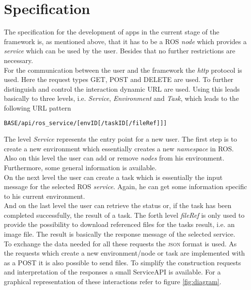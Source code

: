 \documentclass[10pt,a4paper]{article}
\begin{document}
	\section*{Specification}
		The specification for the development of apps in the current stage of the framework is, as
		mentioned above, that it has to be a \textsc{ROS} \emph{node} which provides a
		\emph{service} which can be used by the user. Besides that no further restrictions are
		necessary. \\
		For the communication between the user and the framework the \emph{http} protocol is used.
		Here the request types \textsc{GET}, \textsc{POST} and \textsc{DELETE} are used. To further
		distinguish and control the interaction dynamic URL are used. Using this leads basically to
		three levels, i.e. \emph{Service}, \emph{Environment} and \emph{Task}, which leads to the
		following URL pattern
		\begin{lstlisting}
BASE/api/ros_service/[envID[/taskID[/fileRef]]]
		\end{lstlisting}
		The level \emph{Service} represents the entry point for a new user. The first step is to
		create a new environment which essentially creates a new \emph{namespace} in \textsc{ROS}.
		Also on this level the user can add or remove \emph{nodes} from his environment.
		Furthermore, some general information is available. \\
		On the next level the user can create a task which is essentially the input message for
		the selected \textsc{ROS} \emph{service}. Again, he can get some information specific to
		his current environment. \\
		And on the last level the user can retrieve the status or, if the task has been completed
		successfully, the result of a task. The forth level \emph{fileRef} is only used to provide
		the possibility to download referenced files for the tasks result, i.e. an image file. The
		result is basically the response message of the selected service. \\
		To exchange the data needed for all these requests the \textsc{json} format is used. As
		the requests which create a new environment/node or task are implemented with as a
		\textsc{POST} it is also possible to send files. To simplify the construction requests and
		interpretation of the responses a small ServiceAPI is available. For a graphical
		representation of these interactions refer to figure \ref{fig:diagram}. 
		
\end{document}
